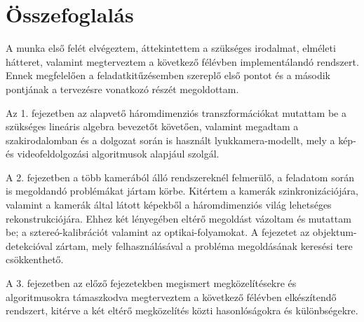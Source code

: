 \chapter{Összefoglalás}

A munka első felét elvégeztem, áttekintettem a szükséges irodalmat, elméleti hátteret, valamint megterveztem a következő félévben implementálandó rendszert. Ennek megfelelően a feladatkitűzésemben szereplő első pontot és a második pontjának a tervezésre vonatkozó részét megoldottam.

Az 1. fejezetben az alapvető háromdimenziós transzformációkat mutattam be a szükséges lineáris algebra bevezetőt követően, valamint megadtam a szakirodalomban és a dolgozat során is használt lyukkamera-modellt, mely a kép- és videofeldolgozási algoritmusok alapjául szolgál.

A 2. fejezetben a több kamerából álló rendszereknél felmerülő, a feladatom során is megoldandó problémákat jártam körbe. Kitértem a kamerák szinkronizációjára, valamint a kamerák által látott képekből a háromdimenziós világ lehetséges rekonstrukciójára. Ehhez két lényegében eltérő megoldást vázoltam és mutattam be; a sztereó-kalibrációt valamint az optikai-folyamokat. A fejezetet az objektum-detekcióval zártam, mely felhasználásával a probléma megoldásának keresési tere csökkenthető.

A 3. fejezetben az előző fejezetekben megismert megközelítésekre és algoritmusokra támaszkodva megterveztem a következő félévben elkészítendő rendszert, kitérve a két eltérő megközelítés közti hasonlóságokra és különbségekre.